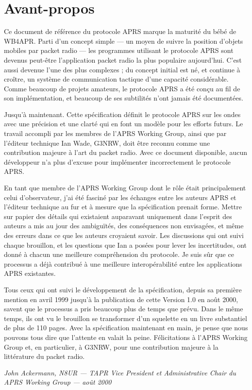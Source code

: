 \thispagestyle{empty}
\section*{Avant-propos}\label{avant-propos}

Ce document de référence du protocole APRS marque la maturité du bébé de
WB4APR. Parti d'un concept simple --- un moyen de suivre la position
d'objets mobiles par packet radio --- les programmes utilisant le
protocole APRS sont devenus peut-être l'application packet radio la plus
populaire aujourd'hui. C'est aussi devenue l'une des plus complexes ; du
concept initial est né, et continue à croître, un système de
communication tactique d'une capacité considérable. Comme beaucoup de
projets amateurs, le protocole APRS a été conçu au fil de son
implémentation, et beaucoup de ses subtilités n'ont jamais été
documentées.

Jusqu'à maintenant. Cette spécification définit le protocole APRS sur
les ondes avec une précision et une clarté qui en font un modèle pour
les efforts futurs. Le travail accompli par les membres de l'APRS
Working Group, ainsi que par l'éditeur technique Ian Wade, G3NRW, doit
être reconnu comme une contribution majeure à l'art du packet radio.
Avec ce document disponible, aucun développeur n'a plus d'excuse pour
implémenter incorrectement le protocole APRS.

En tant que membre de l'APRS Working Group dont le rôle était
principalement celui d'observateur, j'ai été fasciné par les échanges
entre les auteurs APRS et l'éditeur technique au fur et à mesure que la
spécification prenait forme. Mettre sur papier des détails qui
existaient auparavant uniquement dans l'esprit des auteurs a mis au jour
des ambiguïtés, des conséquences non envisagées, et même des erreurs
dans ce que les auteurs croyaient savoir. Les discussions qui ont suivi
chaque brouillon, et les questions que Ian a posées pour lever les
incertitudes, ont donné à chacun une meilleure compréhension du
protocole. Je suis sûr que ce processus a déjà contribué à une meilleure
interopérabilité entre les applications APRS existantes.

Tous ceux qui ont suivi le développement de la spécification, depuis sa
première mention en avril 1999 jusqu'à la publication de cette Version
1.0 en août 2000, savent que le processus a pris beaucoup plus de temps
que prévu. Dans le même temps, ils ont vu le brouillon se transformer
d'un squelette en un livre substantiel de plus de 110 pages. Avec la
spécification maintenant en main, je pense que nous pouvons tous dire
que l'attente en valait la peine. Félicitations à l'APRS Working Group
et, en particulier, à G3NRW, pour une contribution majeure à la
littérature du packet radio.

\emph{John Ackermann, N8UR --- TAPR Vice President et Administrative
Chair du APRS Working Group --- août 2000}
